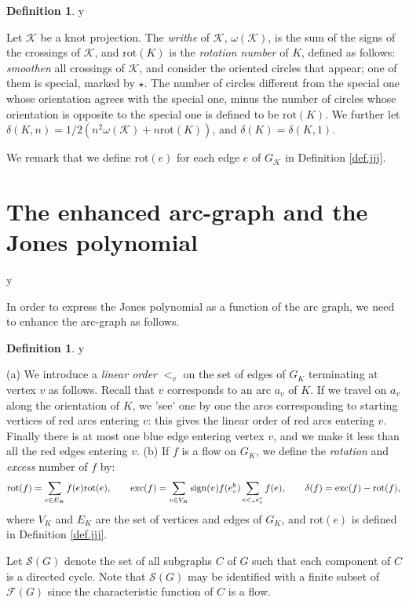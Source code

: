 \documentclass{amsart}
\theoremstyle{plain}
\theoremstyle{definition}
\newtheorem{definition}[proposition]{Definition}
\theoremstyle{remark}
\def\printname#1{
        \if\draft y
                \smash{\makebox[0pt]{\hspace{-0.5in}
                        \raisebox{8pt}{\tt\tiny #1}}}
        \fi
}
\def\lbl#1{\label{#1}\printname{#1}}
\def\K{\mathcal K}
\def\F{\mathcal F}
\def\w{\omega}
\def\d{\delta}
\def\rot{\mathrm{rot}}
\def\Sev{{\mathcal S}}
\def\sign{\mathrm{sign}}
\def\exc{\mathrm{exc}}
\begin{document}
\begin{definition}
\lbl{def.jj}
Let $\K$ be a knot projection. The {\em writhe} of $\K$, $\w(\K)$, is the 
sum of the signs of the
crossings of $\K$, and $\rot(K)$ is the {\em rotation number} of $K$, 
defined as follows: {\em smoothen} all crossings of $\K$, and consider the 
oriented circles that appear; one of them is special, marked by $\star$. 
The number of 
circles different from the special one whose orientation agrees with the 
special one, minus the number of circles whose orientation is opposite to the
special one is defined to be $\rot(K)$. 
We further let $\d(K,n)= 1/2 (n^2\w(\K)+n\rot(K))$, and $\d(K)= \d(K,1)$.
\end{definition}

We remark that we define $\rot(e)$ for each edge $e$ of $G_{\K}$ in 
Definition \ref{def.jjj}.


\section{The enhanced arc-graph and the Jones polynomial}
\lbl{sub.enhanced}


In order to express the Jones polynomial as a function of the arc graph, we 
need to enhance the arc-graph as follows.

\begin{definition}
\lbl{def.rotten}
{\rm (a)}
We introduce a {\em linear order} $<_v$ on the set of
edges of $G_K$ terminating at vertex $v$ as follows. Recall that
$v$ corresponds to an arc $a_v$ of $K$. 
If we travel on $a_v$ along the orientation of $K$, we 'see' one by one the 
arcs corresponding to starting vertices of red arcs 
entering $v$: this gives the linear order of red arcs entering $v$. 
Finally there is at most one blue edge entering vertex $v$, and we make it 
less than all the red edges entering $v$. 
\newline
{\rm (b)}
If $f$ is a flow on $G_K$, we define the {\em rotation} and {\em excess}
number of $f$ by:
\begin{equation}
\lbl{eq.rotexc}
\rot(f)=\sum_{e\in E_K} f(e)\rot(e),
\qquad
\exc(f)=\sum_{v \in V_K} \sign(v) f(e^b_v) \sum_{e<_v e^r_v}f(e),
\qquad \d(f)=\exc(f)-\rot(f),  
\end{equation}
where $V_K$ and $E_K$ are the set of vertices and edges of $G_K$, and $\rot(e)$
is defined in Definition \ref{def.jjj}.
\end{definition}

Let $\Sev(G)$ denote the set of all subgraphs $C$ of $G$ such that each 
component
of $C$ is a directed cycle. Note that $\Sev(G)$ may be identified with a 
finite subset of $\F(G)$ since the characteristic function of $C$ is a flow.
\end{document}
